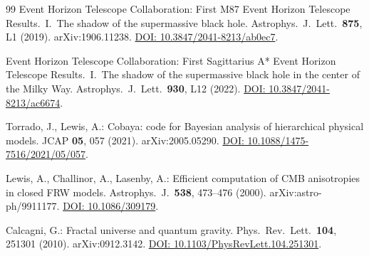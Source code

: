 ﻿\documentclass[12pt,a4paper]{article}
\theoremstyle{definition}
\begin{document}
\begin{thebibliography}{99}
Event Horizon Telescope Collaboration: First M87 Event Horizon Telescope Results.\ I.\ The shadow of the supermassive black hole. Astrophys.\ J.\ Lett.\ \textbf{875}, L1 (2019). arXiv:1906.11238. \href{https://doi.org/10.3847/2041-8213/ab0ec7}{DOI: 10.3847/2041-8213/ab0ec7}.

Event Horizon Telescope Collaboration: First Sagittarius A* Event Horizon Telescope Results.\ I.\ The shadow of the supermassive black hole in the center of the Milky Way. Astrophys.\ J.\ Lett.\ \textbf{930}, L12 (2022). \href{https://doi.org/10.3847/2041-8213/ac6674}{DOI: 10.3847/2041-8213/ac6674}.

Torrado, J., Lewis, A.: Cobaya: code for Bayesian analysis of hierarchical physical models. JCAP \textbf{05}, 057 (2021). arXiv:2005.05290. \href{https://doi.org/10.1088/1475-7516/2021/05/057}{DOI: 10.1088/1475-7516/2021/05/057}.

Lewis, A., Challinor, A., Lasenby, A.: Efficient computation of CMB anisotropies in closed FRW models. Astrophys.\ J.\ \textbf{538}, 473--476 (2000). arXiv:astro-ph/9911177. \href{https://doi.org/10.1086/309179}{DOI: 10.1086/309179}.

Calcagni, G.: Fractal universe and quantum gravity. Phys.\ Rev.\ Lett.\ \textbf{104}, 251301 (2010). arXiv:0912.3142. \href{https://doi.org/10.1103/PhysRevLett.104.251301}{DOI: 10.1103/PhysRevLett.104.251301}.

\end{thebibliography}
\end{document}
